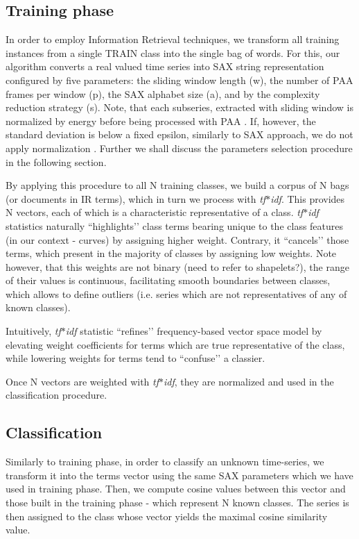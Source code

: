 \documentclass{llncs}
\begin{document}
\subsection{Training phase}
In order to employ Information Retrieval techniques, we transform all training instances from a
single TRAIN class into the single bag of words. For this, our algorithm converts a real valued time
series into SAX string representation configured by five parameters: the sliding window length (w),
the number of PAA frames per window (p), the SAX alphabet size (a), and by the complexity reduction
strategy (s). Note, that each subseries, extracted with sliding window is normalized by energy
before being processed with PAA \cite{goldin_kanellakis}. If, however, the standard deviation is
below a fixed epsilon, similarly to SAX approach, we do not apply normalization
\cite{sax}. Further we shall discuss the parameters selection procedure in the following section.

By applying this procedure to all N training classes, we build a corpus of N bags (or documents in
IR terms), which in turn we process with \textit{tf$\ast$idf}. This provides N vectors, each of
which is a characteristic representative of a class. \textit{tf$\ast$idf} statistics naturally
``highlights’’ class terms bearing unique to the class features (in our context - curves) by
assigning higher weight. Contrary, it ``cancels’’ those terms, which present in the majority of
classes by assigning low weights. Note however, that this weights are not binary (need to refer to
shapelets?), the range of their values is continuous, facilitating smooth boundaries between
classes, which allows to define outliers (i.e. series which are not representatives of any of known
classes).

Intuitively, \textit{tf$\ast$idf} statistic ``refines’’ frequency-based vector space model by
elevating weight coefficients for terms which are true representative of the class, while lowering
weights for terms tend to ``confuse’’ a classier.

Once N vectors are weighted with \textit{tf$\ast$idf}, they are normalized and used in the
classification procedure.



\subsection{Classification}
Similarly to training phase, in order to classify an unknown time-series, we transform it into the
terms vector using the same SAX parameters which we have used in training phase. Then, we compute
cosine values between this vector and those built in the training phase - which represent N known
classes. The series is then assigned to the class whose vector yields the maximal cosine similarity
value.
\end{document}
